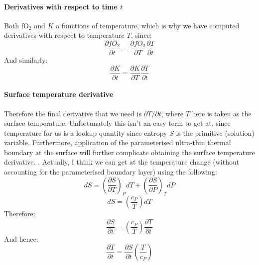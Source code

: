 \paragraph{Derivatives with respect to time $t$}
Both fO$_2$ and $K$ a functions of temperature, which is why we have computed derivatives with respect to temperature $T$, since:
\begin{equation}
\frac{\partial fO_2}{\partial t} = \frac{\partial fO_2}{\partial T} \frac{\partial T}{\partial t}
\end{equation}
And similarly:
\begin{equation}
\frac{\partial K}{\partial t} = \frac{\partial K}{\partial T} \frac{\partial T}{\partial t}
\end{equation}
\paragraph{Surface temperature derivative}
Therefore the final derivative that we need is $\partial T/\partial t$, where $T$ here is taken as the surface temperature.  Unfortunately this isn't an easy term to get at, since temperature for us is a lookup quantity since entropy $S$ is the primitive (solution) variable.  Furthermore, application of the parameterised ultra-thin thermal boundary at the surface will further complicate obtaining the surface temperature derivative.  .  Actually, I think we can get at the temperature change (without accounting for the parameterised boundary layer) using the following:
\begin{equation}
dS = \left( \frac{\partial S}{\partial T} \right)_P dT + \left( \frac{\partial S}{\partial P} \right)_T dP
\end{equation}
\begin{equation}
dS = \left( \frac{c_P}{T} \right) dT
\end{equation}
Therefore:
\begin{equation}
\frac{\partial S}{\partial t} = \left( \frac{c_P}{T} \right) \frac{\partial T}{\partial t}
\end{equation}
And hence:
\begin{equation}
\frac{\partial T}{\partial t} = \frac{\partial S}{\partial t} \left( \frac{T}{c_P} \right)
\end{equation}
